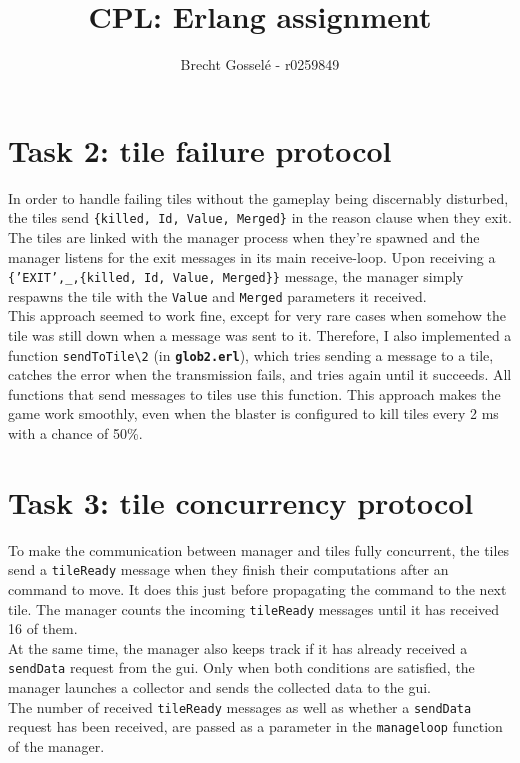 \documentclass{article}
\begin{document}
\title{CPL: Erlang assignment}
\author{Brecht Gossel\'e - r0259849}
\maketitle

\section{Task 2: tile failure protocol}

In order to handle failing tiles without the gameplay being discernably disturbed, the tiles send \texttt{\{killed, Id, Value, Merged\}} in the reason clause when they exit. The tiles are linked with the manager process when they're spawned and the manager listens for the exit messages in its main receive-loop. Upon receiving a \texttt{\{'EXIT',\_,\{killed, Id, Value, Merged\}\}} message, the manager simply respawns the tile with the \texttt{Value} and \texttt{Merged} parameters it received. \\This approach seemed to work fine, except for very rare cases when somehow the tile was still down when a message was sent to it. Therefore, I also implemented a function \texttt{sendToTile\textbackslash2} (in \texttt{\textbf{glob2.erl}}), which tries sending a message to a tile, catches the error when the transmission fails, and tries again until it succeeds. All functions that send messages to tiles use this function. This approach makes the game work smoothly, even when the blaster is configured to kill tiles every 2 ms with a chance of 50\%.

\section{Task 3: tile concurrency protocol}

To make the communication between manager and tiles fully concurrent, the tiles send a \texttt{tileReady} message when they finish their computations after an command to move. It does this just before propagating the command to the next tile. The manager counts the incoming \texttt{tileReady} messages until it has received 16 of them.\\
At the same time, the manager also keeps track if it has already received a \texttt{sendData} request from the gui. Only when both conditions are satisfied, the manager launches a collector and sends the collected data to the gui.
\\The number of received \texttt{tileReady} messages as well as whether a \texttt{sendData} request has been received, are passed as a parameter in the \texttt{manageloop} function of the manager.
\end{document}
